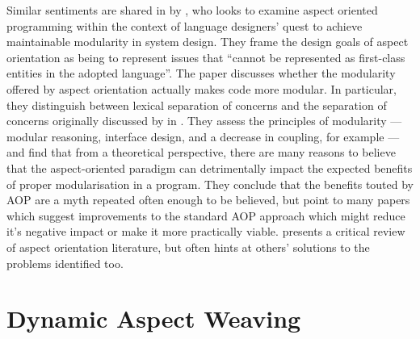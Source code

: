 Similar sentiments are shared in \cite{przybylek2010wrong} by
\citeauthor{przybylek2010wrong}, who looks to examine aspect oriented
programming within the context of language designers' quest to achieve
maintainable modularity in system design. They frame the design goals of aspect
orientation as being to represent issues that ``cannot be represented as
first-class entities in the adopted language''. The paper discusses whether the
modularity offered by aspect orientation actually makes code more modular. In
particular, they distinguish between lexical separation of concerns and the
separation of concerns originally discussed by
\citeauthor{djikstra_scientific_thought} in
. They assess the principles of
modularity --- modular reasoning, interface design, and a decrease in coupling,
for example --- and find that from a theoretical perspective, there are many
reasons to believe that the aspect-oriented paradigm can detrimentally impact
the expected benefits of proper modularisation in a program. They conclude that
the benefits touted by AOP are a myth repeated often enough to be believed, but
point to many papers which suggest improvements to the standard AOP approach
which might reduce it's negative impact or make it more practically viable.
\citeauthor{przybylek2010wrong} presents a critical review of aspect orientation
literature, but often hints at others' solutions to the problems identified too.




\section{Dynamic Aspect Weaving}\label{sec:dynamic_aop_review}

